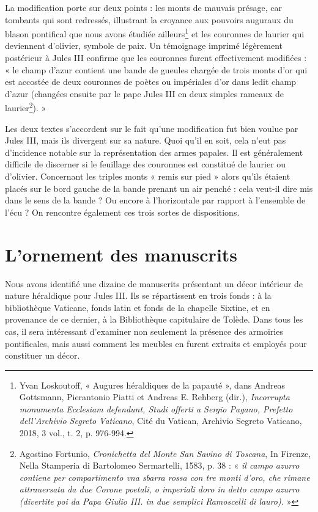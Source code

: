 \documentclass[12pt,twoside,openany]{book}
\begin{document}
La modification porte sur deux points : les monts de mauvais présage, car tombants qui sont redressés, illustrant la croyance aux pouvoirs auguraux du blason pontifical que nous avons étudiée ailleurs\footnote{Yvan Loskoutoff, « Augures héraldiques de la papauté », dans Andreas Gottsmann, Pierantonio Piatti et Andreas E. Rehberg (dir.), \textit{Incorrupta monumenta Ecclesiam defendunt, Studi offerti a Sergio Pagano, Prefetto dell’Archivio Segreto Vaticano}, Cité du Vatican, Archivio Segreto Vaticano, 2018, 3 vol., t. 2, p. 976-994.} et les couronnes de laurier qui deviennent d’olivier, symbole de paix. Un témoignage imprimé légèrement postérieur à Jules III confirme que les couronnes furent effectivement modifiées : « le champ d’azur contient une bande de gueules chargée de trois monts d’or qui est accostée de deux couronnes de poètes ou impériales d’or dans ledit champ d’azur (changées ensuite par le pape Jules III en deux simples rameaux de laurier\footnote{Agostino Fortunio, \textit{Cronichetta del Monte San Savino di Toscana}, In Firenze, Nella Stamperia di Bartolomeo Sermartelli, 1583, p. 38 : « \textit{il campo azurro contiene per compartimento vna sbarra rossa con tre monti d’oro, che rimane attrauersata da due Corone poetali, o imperiali doro in detto campo azurro (divertite poi da Papa Giulio III. in due semplici Ramoscelli di lauro).} »}). »

Les deux textes s’accordent sur le fait qu’une modification fut bien voulue par Jules III, mais ils divergent sur sa nature. Quoi qu’il en soit, cela n’eut pas d’incidence notable sur la représentation des armes papales. Il est généralement difficile de discerner si le feuillage des couronnes est constitué de laurier ou d’olivier. Concernant les triples monts « remis sur pied » alors qu’ils étaient placés sur le bord gauche de la bande prenant un air penché : cela veut-il dire mis dans le sens de la bande ? Ou encore à l’horizontale par rapport à l’ensemble de l’écu ? On rencontre également ces trois sortes de dispositions.

\section{L’ornement des manuscrits}

Nous avons identifié une dizaine de manuscrits présentant un décor intérieur de nature héraldique pour Jules III. Ils se répartissent en trois fonds : à la bibliothèque Vaticane, fonds latin et fonds de la chapelle Sixtine, et en provenance de ce dernier, à la Bibliothèque capitulaire de Tolède. Dans tous les cas, il sera intéressant d’examiner non seulement la présence des armoiries pontificales, mais aussi comment les meubles en furent extraits et employés pour constituer un décor.
\end{document}
